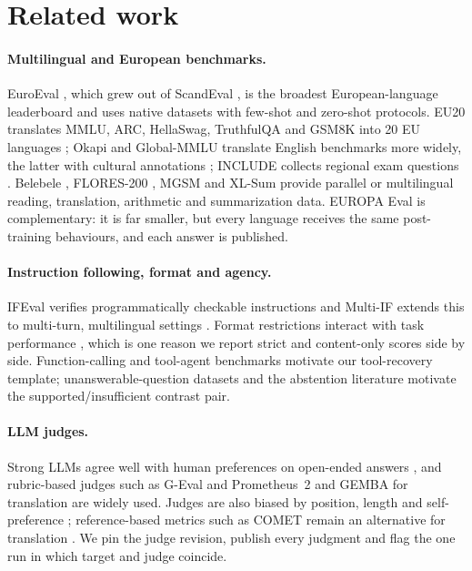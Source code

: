 \documentclass[11pt]{article}
\begin{document}
\section{Related work}
\label{sec:related}

\paragraph{Multilingual and European benchmarks.} EuroEval \citep{euroeval}, which grew out of ScandEval \citep{nielsen2023scandeval}, is the broadest European-language leaderboard and uses native datasets with few-shot and zero-shot protocols. EU20 translates MMLU, ARC, HellaSwag, TruthfulQA and GSM8K into 20 EU languages \citep{thellmann2024eu20}; Okapi and Global-MMLU translate English benchmarks more widely, the latter with cultural annotations \citep{lai2023okapi,singh2025globalmmlu}; INCLUDE collects regional exam questions \citep{romanou2025include}. Belebele \citep{bandarkar2024belebele}, FLORES-200 \citep{nllb2022flores}, MGSM \citep{shi2023mgsm} and XL-Sum \citep{hasan2021xlsum} provide parallel or multilingual reading, translation, arithmetic and summarization data. EUROPA Eval is complementary: it is far smaller, but every language receives the same post-training behaviours, and each answer is published.

\paragraph{Instruction following, format and agency.} IFEval verifies programmatically checkable instructions \citep{zhou2023ifeval} and Multi-IF extends this to multi-turn, multilingual settings \citep{he2024multiif}. Format restrictions interact with task performance \citep{tam2024letmespeak}, which is one reason we report strict and content-only scores side by side. Function-calling and tool-agent benchmarks \citep{patil2025bfcl,yao2025taubench} motivate our tool-recovery template; unanswerable-question datasets and the abstention literature \citep{rajpurkar2018squad2,wen2025abstention} motivate the supported/insufficient contrast pair.

\paragraph{LLM judges.} Strong LLMs agree well with human preferences on open-ended answers \citep{zheng2023judging}, and rubric-based judges such as G-Eval and Prometheus~2 \citep{liu2023geval,kim2024prometheus2} and GEMBA for translation \citep{kocmi2023gemba} are widely used. Judges are also biased by position, length and self-preference \citep{wang2024fair,panickssery2024selfpref}; reference-based metrics such as COMET remain an alternative for translation \citep{rei2020comet}. We pin the judge revision, publish every judgment and flag the one run in which target and judge coincide.
\end{document}
